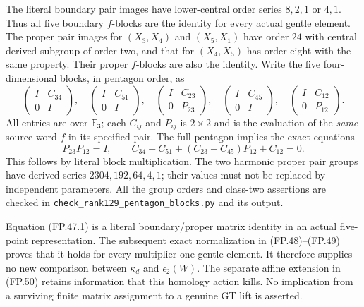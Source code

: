 The literal boundary pair images have lower-central order
series $8,2,1$ or $4,1$. Thus all five boundary $f$-blocks
are the identity for every actual gentle element. The proper
pair images for $(X_3,X_4)$ and $(X_5,X_1)$ have order $24$
with central derived subgroup of order two, and that for
$(X_4,X_5)$ has order eight with the same property. Their
proper $f$-blocks are also the identity. Write the five
four-dimensional blocks, in pentagon order, as
\[
 \begin{pmatrix}I&C_{34}\\0&I\end{pmatrix},\quad
 \begin{pmatrix}I&C_{51}\\0&I\end{pmatrix},\quad
 \begin{pmatrix}I&C_{23}\\0&P_{23}\end{pmatrix},\quad
 \begin{pmatrix}I&C_{45}\\0&I\end{pmatrix},\quad
 \begin{pmatrix}I&C_{12}\\0&P_{12}\end{pmatrix}.
\]
All entries are over $\mathbb F_3$; each $C_{ij}$ and $P_{ij}$
is $2\times2$ and is the evaluation of the \emph{same} source
word $f$ in its specified pair. The full pentagon implies
the exact equations
\[
 \boxed{\quad P_{23}P_{12}=I,\qquad
 C_{34}+C_{51}+(C_{23}+C_{45})P_{12}+C_{12}=0.\quad}
 \tag{FP.47.1}
\]
This follows by literal block multiplication. The two harmonic
proper pair groups have derived series
$2304,192,64,4,1$; their values must not be replaced by
independent parameters. All the group orders and class-two
assertions are checked in
\texttt{check\_rank129\_pentagon\_blocks.py} and its output.

Equation (FP.47.1) is a literal boundary/proper matrix identity
in an actual five-point representation. The subsequent exact
normalization in (FP.48)--(FP.49) proves that it holds for
every multiplier-one gentle element. It therefore supplies
no new comparison between $\kappa_d$ and $\epsilon_2(W)$.
The separate affine extension in (FP.50) retains information
that this homology action kills. No implication from a
surviving finite matrix assignment to a genuine GT lift is
asserted.

